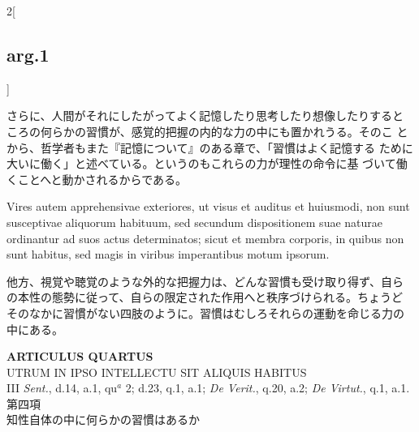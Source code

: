 \documentclass[paper=a4paper,fontsize=10pt,jafontsize=9pt,titlepage]{jlreq}
\begin{document}
\begin{paracol}{2}[\subsection{arg.1}]
\switchcolumn

さらに、人間がそれにしたがってよく記憶したり思考したり想像したりすると
 ころの何らかの習慣が、感覚的把握の内的な力の中にも置かれうる。そのこ
 とから、哲学者もまた『記憶について』のある章で、「習慣はよく記憶する
 ために大いに働く」と述べている。というのもこれらの力が理性の命令に基
 づいて働くことへと動かされるからである。

\switchcolumn*

Vires autem apprehensivae exteriores, ut visus et auditus et
huiusmodi, non sunt susceptivae aliquorum habituum, sed secundum
dispositionem suae naturae ordinantur ad suos actus determinatos;
sicut et membra corporis, in quibus non sunt habitus, sed magis in
viribus imperantibus motum ipsorum.

\switchcolumn

他方、視覚や聴覚のような外的な把握力は、どんな習慣も受け取り得ず、自ら
の本性の態勢に従って、自らの限定された作用へと秩序づけられる。ちょうど
そのなかに習慣がない四肢のように。習慣はむしろそれらの運動を命じる力の
中にある。

\end{paracol}
\newpage


{}
\setcounter{section}{4}
\setcounter{subsection}{0}
\begin{center}
{\Large {\bfseries ARTICULUS QUARTUS}}\\
{\large UTRUM IN IPSO INTELLECTU SIT ALIQUIS HABITUS}\\
{\footnotesize III {\itshape Sent.}, d.14, a.1, qu$^{a}$ 2; d.23, q.1,
 a.1; {\itshape De Verit.}, q.20, a.2; {\itshape De Virtut.}, q.1, a.1.}\\
{\Large 第四項\\知性自体の中に何らかの習慣はあるか}
\end{center}
\end{document}
